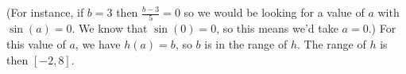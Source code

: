 \documentclass[nooutcomes]{ximera}
\begin{document}
\begin{example}
\begin{explanation}
\begin{enumerate}
					(For instance, if $b=3$ then $\frac{b-3}{5} = 0$ so we would be looking for a value of $a$ with $\sin(a) = 0$. We know that $\sin(0) = 0$, so this means we'd take $a=0$.)
					For this value of $a$, we have $h(a) = b$, so $b$ is in the range of $h$. The range of $h$ is then $[-2, 8]$.
			\end{enumerate}
		\end{explanation}
	\end{example}
\end{document}
